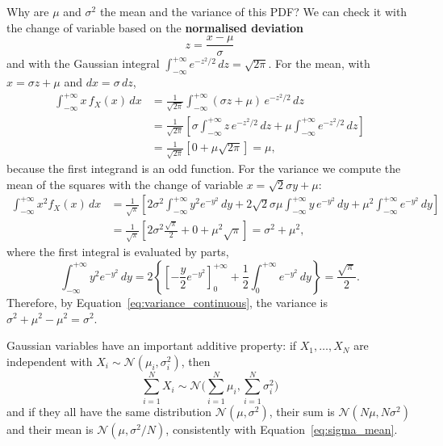 \documentclass[letterpaper,11pt,leqno]{book}
\begin{document}
Why are $\mu$ and $\sigma^2$ the mean and the variance of this PDF? We can check it with the change of variable based on the \textbf{normalised deviation}
\begin{equation}
\boxed{z = \frac{x - \mu}{\sigma}}
\label{eq:normalised_deviation}
\end{equation}
and with the Gaussian integral $\int_{-\infty}^{+\infty}e^{-z^2/2}\,dz = \sqrt{2\pi}$. For the mean, with $x = \sigma z + \mu$ and $dx = \sigma\,dz$,
\begin{align*}
\int_{-\infty}^{+\infty}x\,f_X(x)\,dx &= \frac{1}{\sqrt{2\pi}}\int_{-\infty}^{+\infty}(\sigma z + \mu)\,e^{-z^2/2}\,dz \\
&= \frac{1}{\sqrt{2\pi}}\left[\sigma\int_{-\infty}^{+\infty}z\,e^{-z^2/2}\,dz + \mu\int_{-\infty}^{+\infty}e^{-z^2/2}\,dz\right] \\
&= \frac{1}{\sqrt{2\pi}}\left[0 + \mu\sqrt{2\pi}\right] = \mu,
\end{align*}
because the first integrand is an odd function. For the variance we compute the mean of the squares with the change of variable $x = \sqrt{2}\sigma y + \mu$:
\begin{align*}
\int_{-\infty}^{+\infty}x^2f_X(x)\,dx &= \frac{1}{\sqrt{\pi}}\left[2\sigma^2\int_{-\infty}^{+\infty}y^2e^{-y^2}\,dy + 2\sqrt{2}\sigma\mu\int_{-\infty}^{+\infty}y\,e^{-y^2}\,dy + \mu^2\int_{-\infty}^{+\infty}e^{-y^2}\,dy\right] \\
&= \frac{1}{\sqrt{\pi}}\left[2\sigma^2\frac{\sqrt{\pi}}{2} + 0 + \mu^2\sqrt{\pi}\right] = \sigma^2 + \mu^2,
\end{align*}
where the first integral is evaluated by parts,
\begin{equation*}
\int_{-\infty}^{+\infty}y^2e^{-y^2}\,dy = 2\left\{\left[-\frac{y}{2}e^{-y^2}\right]_0^{+\infty} + \frac{1}{2}\int_0^{+\infty}e^{-y^2}\,dy\right\} = \frac{\sqrt{\pi}}{2}.
\end{equation*}
Therefore, by Equation~\eqref{eq:variance_continuous}, the variance is $\sigma^2 + \mu^2 - \mu^2 = \sigma^2$.

Gaussian variables have an important additive property: if $X_1, \dots, X_N$ are independent with $X_i \sim \mathcal{N}(\mu_i, \sigma_i^2)$, then
\begin{equation}
\boxed{\sum_{i=1}^{N}X_i \sim \mathcal{N}\Big(\sum_{i=1}^{N}\mu_i, \sum_{i=1}^{N}\sigma_i^2\Big)}
\label{eq:sum_gaussians}
\end{equation}
and if they all have the same distribution $\mathcal{N}(\mu, \sigma^2)$, their sum is $\mathcal{N}(N\mu, N\sigma^2)$ and their mean is $\mathcal{N}(\mu, \sigma^2/N)$, consistently with Equation~\eqref{eq:sigma_mean}.
\end{document}
